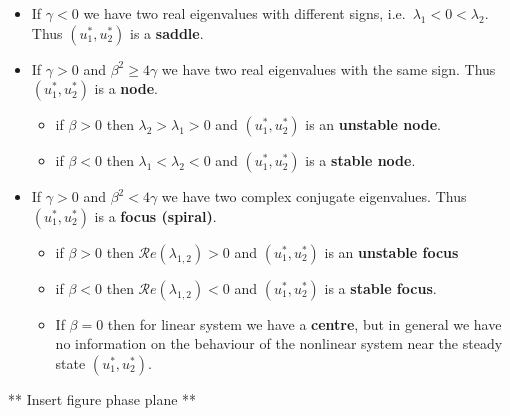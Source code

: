 \documentclass[
  letterpaper,
  DIV=11,
  numbers=noendperiod]{scrreprt}
\providecommand{\tightlist}{%
  \setlength{\itemsep}{0pt}\setlength{\parskip}{0pt}}\usepackage{longtable,booktabs,array}
\theoremstyle{definition}
\theoremstyle{plain}
\theoremstyle{plain}
\theoremstyle{remark}
\begin{document}
\begin{itemize}
\item
  If \(\gamma <0\) we have two real eigenvalues with different signs,
  i.e.~\(\lambda_1 < 0 < \lambda_2\). Thus \((u^\ast_1, u^\ast_2)\) is a
  \textbf{saddle}.
\item
  If \(\gamma >0\) and \(\beta^2 \geq 4\gamma\) we have two real
  eigenvalues with the same sign. Thus \((u^\ast_1, u^\ast_2)\) is a
  \textbf{node}.

  \begin{itemize}
  \tightlist
  \item
    if \(\beta >0\) then \(\lambda_2 > \lambda_1 >0\) and
    \((u^\ast_1, u^\ast_2)\) is an \textbf{unstable node}.
  \item
    if \(\beta <0\) then \(\lambda_1 < \lambda_2 < 0\) and
    \((u^\ast_1, u^\ast_2)\) is a \textbf{stable node}.
  \end{itemize}
\item
  If \(\gamma >0\) and \(\beta^2 < 4\gamma\) we have two complex
  conjugate eigenvalues. Thus \((u^\ast_1, u^\ast_2)\) is a
  \textbf{focus (spiral)}.

  \begin{itemize}
  \item
    if \(\beta >0\) then \(\mathcal Re(\lambda_{1,2}) > 0\) and
    \((u^\ast_1, u^\ast_2)\) is an \textbf{unstable focus}
  \item
    if \(\beta <0\) then \(\mathcal Re(\lambda_{1,2}) < 0\) and
    \((u^\ast_1, u^\ast_2)\) is a \textbf{stable focus}.
  \item
    If \(\beta =0\) then for linear system we have a \textbf{centre},
    but in general we have no information on the behaviour of the
    nonlinear system near the steady state \((u^\ast_1, u^\ast_2)\).
  \end{itemize}
\end{itemize}

** Insert figure phase plane **
\end{document}
